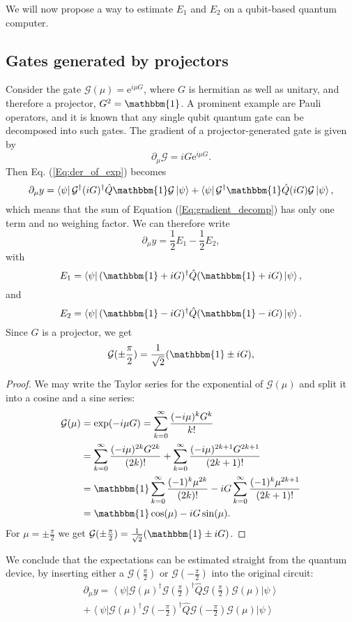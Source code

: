 \documentclass[aps,pra,10pt,twocolumn,groupedaddress,nofootinbib]{revtex4-1}
\theoremstyle{plain}
\newcommand{\I}{\mathbbm{1}} %
\newcommand{\ket}[1]{\ensuremath{\left| #1 \right \rangle}}
\newcommand{\bra}[1]{\ensuremath{\left \langle #1 \right |}}
\newcommand{\e}{\mathrm{e}}
\newcommand{\G}{\mathcal{G}}
\begin{document}
We will now propose a way to estimate $E_1$ and $E_2$ on a qubit-based quantum computer.\\

\subsection{Gates generated by projectors}
Consider the gate $\G(\mu) = \e^{i \mu G}$, where $G$ is hermitian as well as unitary, and therefore a projector, $G^2 = \mathbbm{1}$. A prominent example are Pauli operators, and it is known that any single qubit quantum gate can be decomposed into such gates. The gradient of a projector-generated gate is given by
\[ \partial_{\mu} \G = i G \e^{i \mu G}.    \]
Then Eq. (\ref{Eq:der_of_exp}) becomes
\[ \partial_{\mu} y =   \bra{\psi} \G^{\dagger} (iG)^{\dagger}  \hat{Q} \mathbbm{1} \G \ket{\psi} + \bra{\psi} \G^{\dagger} \mathbbm{1}  \hat{Q} (iG) \G \ket{\psi} , \]
which means that the sum of Equation (\ref{Eq:gradient_decomp}) has only one term and no weighing factor. We can therefore write
\[ \partial_{\mu} y = \frac{1}{2}E_1 - \frac{1}{2} E_2, \]
with
\[E_1 = \bra{\psi} (\mathbbm{1} + iG)^{\dagger} \hat{Q} (\mathbbm{1} + iG) \ket{\psi},\]
and
\[E_2= \bra{\psi}(\mathbbm{1} - iG)^{\dagger}  \hat{Q} (\mathbbm{1} - iG) \ket{\psi}. \]
Since $G$ is a projector, we get
\begin{equation}
	\G(\pm \frac{\pi}{2}) = \frac{1}{\sqrt{2}}(\I \pm iG),
	\label{Eq:Pauli_equality}
\end{equation}

\begin{proof}
We may write the Taylor series for the exponential of $\G(\mu)$
and split it into a cosine and a sine series:
\begin{align*}
\mathcal{G}(\mu) &= \exp(-i\mu G) = \sum_{k=0}^\infty \frac{(-i\mu)^k G^k}{k!}\\
&=
\sum_{k=0}^\infty \frac{(-i\mu)^{2k} G^{2k}}{(2k)!}
+\sum_{k=0}^\infty \frac{(-i\mu)^{2k+1} G^{2k+1}}{(2k+1)!}\\
&=
\I \sum_{k=0}^\infty \frac{(-1)^{k} \mu^{2k}}{(2k)!}
-i G \sum_{k=0}^\infty \frac{(-1)^{k} \mu^{2k+1}}{(2k+1)!}\\
&=
\I \cos(\mu)
-i G \sin(\mu).
\end{align*}
For $\mu = \pm \frac{\pi}{2}$ we get $\G(\pm \frac{\pi}{2}) = \frac{1}{\sqrt{2}}(\I \pm iG)$.
\end{proof}

We conclude that the expectations can be estimated straight from the quantum device, by inserting either a $\G(\frac{\pi}{2})$ or $\G(-\frac{\pi}{2})$ into the original circuit:
\begin{multline*}
	\partial_{\mu} y =   \bra{\psi} \G\left(\mu \right)^{\dagger} \G \left(\frac{\pi}{2} \right)^{\dagger}  \hat{Q} \G \left(\frac{\pi}{2} \right) \G\left(\mu \right) \ket{\psi} \\ + \bra{\psi} \G\left(\mu \right)^{\dagger} \G \left(- \frac{\pi}{2} \right)^{\dagger} \hat{Q} \G \left(-\frac{\pi}{2} \right) \G\left(\mu \right) \ket{\psi}
\end{multline*}
\end{document}

